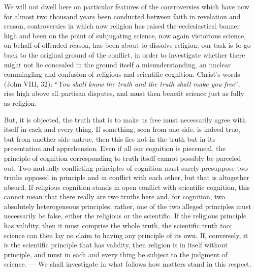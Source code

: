 \documentclass[12pt,a4paper]{article}
\newcommand{\opage}[1]{\marginnote{\footnotesize\textit{[#1]}}}
\begin{document}
We will not dwell here on particular features of the controversies
which have now for almost two thousand years been conducted between
faith in revelation and reason, controversies in which now religion has
raised the ecclesiastical banner high and been on the point of
subjugating science, now again victorious science, on behalf of
offended reason, has been about to dissolve religion; our task is to go
back to the original ground of the conflict, in order to investigate
whether there might not lie concealed in the ground itself a
misunderstanding, an unclear commingling and confusion of religious and
scientific cognition. Christ's words (John VIII, 32): ``\emph{You shall
know the truth and the truth shall make you free}'', rise high above
all partisan disputes, and must then benefit science just as fully as
religion.

But, it is objected, the truth that is to make us free must necessarily
agree with itself in each and every thing. If something, seen from one
side, is indeed true, but from another side untrue, then this lies not
in the truth but in its presentation and apprehension. Even if all our
cognition is piecemeal, the principle of cognition corresponding to
truth itself cannot possibly be parceled out. Two mutually conflicting
principles of cognition must surely presuppose two truths opposed in
principle and in conflict with each other, but that is altogether
absurd. If religious cognition stands in open conflict with scientific
cognition, this cannot mean that there really are two truths here and,
for cognition, two absolutely heterogeneous principles; rather, one of
the two \opage{4} alleged principles must necessarily be false, either
the religious or the scientific. If the religious principle has
validity, then it must comprise the whole truth, the scientific truth
too; science can then lay no claim to having any principle of its own.
If, conversely, it is the scientific principle that has validity, then
religion is in itself without principle, and must in each and every
thing be subject to the judgment of science. --- We shall investigate
in what follows how matters stand in this respect.
\end{document}
